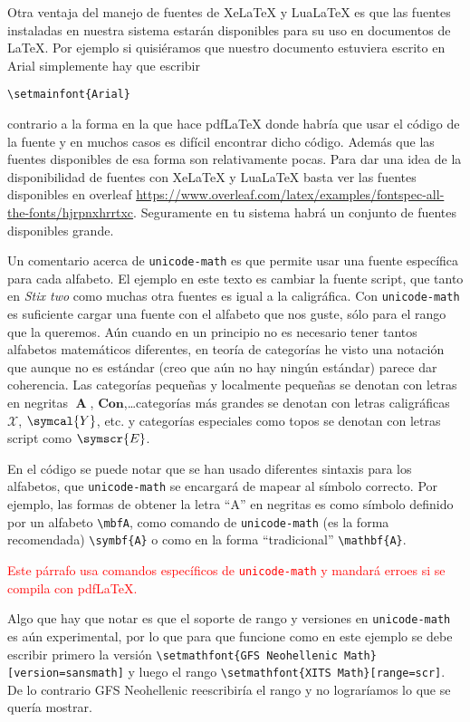Otra ventaja del manejo de fuentes de Xe\LaTeX{} y Lua\LaTeX{} es que las
fuentes instaladas en nuestra sistema estarán disponibles para su uso en
documentos de \LaTeX{}. Por ejemplo si quisiéramos que nuestro documento
estuviera escrito en Arial simplemente hay que escribir
\begin{flushleft}
  \verb|\setmainfont{Arial}|
\end{flushleft}
contrario a la forma en la que hace pdf\LaTeX{} donde habría que usar el
código de la fuente y en muchos casos es difícil encontrar dicho código.
Además que las fuentes disponibles de esa forma son relativamente pocas.
Para dar una idea de la disponibilidad de fuentes con Xe\LaTeX{} y
Lua\LaTeX{} basta ver las fuentes disponibles en overleaf \url{https://www.overleaf.com/latex/examples/fontspec-all-the-fonts/hjrpnxhrrtxc}.
Seguramente en tu sistema habrá un conjunto de fuentes disponibles grande.

\ifluatex%
Un comentario acerca de \texttt{unicode-math} es que permite usar una
fuente específica para cada alfabeto. El ejemplo en este texto es cambiar la
fuente script, que tanto en \textit{Stix two} como muchas otra fuentes es
igual a la caligráfica. Con \texttt{unicode-math} es suficiente cargar una
fuente con el alfabeto que nos guste, sólo para el rango que la queremos.
Aún cuando en un principio no es necesario tener tantos alfabetos matemáticos
diferentes, en teoría de categorías he visto una notación que aunque no es
estándar (creo que aún no hay ningún estándar) parece dar coherencia. Las
categorías pequeñas y localmente pequeñas se denotan con letras en negritas
\(\mbfA \), \(\symbf{Con}\),\ldots categorías más grandes se denotan con
letras caligráficas \(\mathcal{X}\), \(\symcal{Y}\), etc. y categorías
especiales como topos se denotan con letras script como \(\symscr{E}\).

En el código se puede notar que se han usado diferentes sintaxis para los
alfabetos, que \texttt{unicode-math} se encargará de mapear al símbolo
correcto. Por ejemplo, las formas de obtener la letra ``A'' en negritas es
como símbolo definido por un alfabeto \verb|\mbfA|, como comando de
\texttt{unicode-math} (es la forma recomendada) \verb|\symbf{A}| o como en
la forma ``tradicional'' \verb|\mathbf{A}|.
\ifpdftex%
\begin{center}
  \textcolor{red}{Este párrafo usa comandos específicos de \texttt{unicode-math} y mandará erroes si se compila con pdf\LaTeX.}
\end{center}
\fi
\fi

Algo que hay que notar es que el soporte de rango y versiones en
\texttt{unicode-math} es aún experimental, por lo que para que funcione como
en este ejemplo se debe escribir primero la versión
\verb|\setmathfont{GFS Neohellenic Math}[version=sansmath]|
y luego el rango \verb|\setmathfont{XITS Math}[range=scr]|. De lo contrario
GFS Neohellenic reescribiría el rango y no lograríamos lo que se quería
mostrar.
